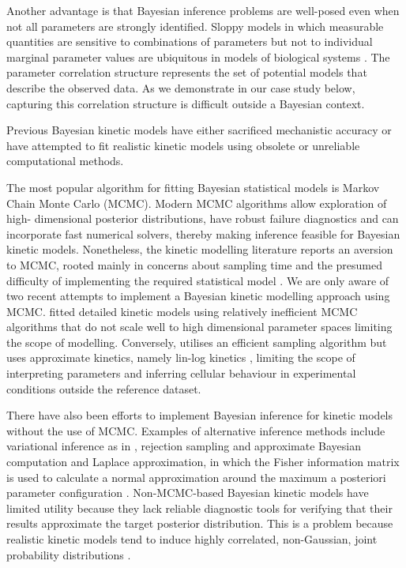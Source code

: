 \documentclass[journal=asbcd6,manuscript=article,layout=traditional]{achemso}
\begin{document}
Another advantage is that Bayesian inference problems are well-posed
even when not all parameters are strongly identified. Sloppy models in
which measurable quantities are sensitive to combinations of parameters
but not to individual marginal parameter values are ubiquitous in models
of biological systems \citep{gutenkunst_2007, white_2016}. The parameter
correlation structure represents the set of potential models that
describe the observed data. As we demonstrate in our case study below,
capturing this correlation structure is difficult outside a Bayesian
context.

Previous Bayesian kinetic models have either sacrificed mechanistic
accuracy or have attempted to fit realistic kinetic models using
obsolete or unreliable computational methods.

The most popular algorithm for fitting Bayesian statistical models is
Markov Chain Monte Carlo (MCMC). Modern MCMC algorithms allow
exploration of high- dimensional posterior distributions, have robust
failure diagnostics
\citep{vehtariRankNormalizationFoldingLocalization2021} and can
incorporate fast numerical solvers, thereby making inference feasible
for Bayesian kinetic models. Nonetheless, the kinetic modelling
literature reports an aversion to MCMC, rooted mainly in concerns about
sampling time and the presumed difficulty of implementing the required
statistical model \citep{raue_joining_2013, saa_construction_2016}. We
are only aware of two recent attempts to implement a Bayesian kinetic
modelling approach using MCMC. \citet{stapor_pesto_2018} fitted detailed
kinetic models using relatively inefficient MCMC algorithms that do not
scale well to high dimensional parameter spaces limiting the scope of
modelling. Conversely, \citet{st.johnBayesianInferenceMetabolic2018}
utilises an efficient sampling algorithm but uses approximate kinetics,
namely lin-log kinetics \citet{visser_dynamic_2003}, limiting the scope
of interpreting parameters and inferring cellular behaviour in
experimental conditions outside the reference dataset.

There have also been efforts to implement Bayesian inference for kinetic
models without the use of MCMC. Examples of alternative inference
methods include variational inference as in
\citet{st.johnBayesianInferenceMetabolic2018}, rejection sampling and
approximate Bayesian computation \citet{saa_construction_2016} and
Laplace approximation, in which the Fisher information matrix is used to
calculate a normal approximation around the maximum a posteriori
parameter configuration
\citep{liebermeister_model_2021, gopalakrishnan_k-fit_2020, stapor_pesto_2018, raue_joining_2013}.
Non-MCMC-based Bayesian kinetic models have limited utility because they
lack reliable diagnostic tools for verifying that their results
approximate the target posterior distribution. This is a problem because
realistic kinetic models tend to induce highly correlated, non-Gaussian,
joint probability distributions
\citep{gutenkunst_2007, stapor_pesto_2018}.
\end{document}
